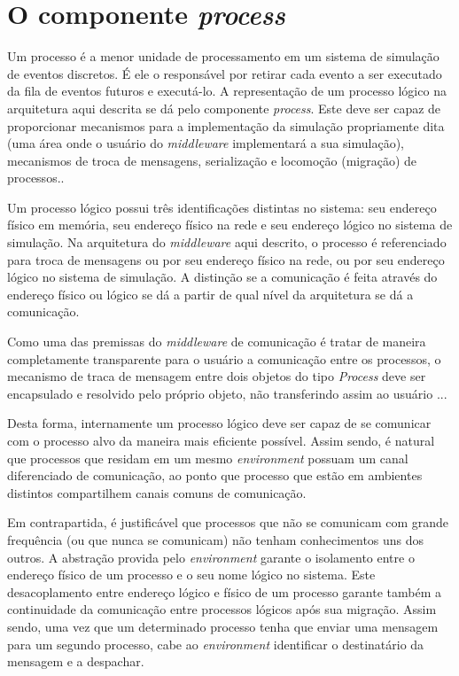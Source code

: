 \section{O componente \textit{process} \label{process}}

Um processo é a menor unidade de processamento em um sistema de simulação de eventos discretos. É ele o responsável por retirar cada evento a ser executado da fila de eventos futuros e executá-lo. A representação de um processo lógico na arquitetura aqui descrita se dá pelo componente \textit{process}. Este deve ser capaz de proporcionar mecanismos para a implementação da simulação propriamente dita (uma área onde o usuário do \textit{middleware} implementará a sua simulação), mecanismos de troca de mensagens, serialização e locomoção (migração) de processos..

Um processo lógico possui três identificações distintas no sistema: seu endereço físico em memória, seu endereço físico na rede e seu endereço lógico no sistema de simulação. Na arquitetura do \textit{middleware} aqui descrito, o processo é referenciado para troca de mensagens ou por seu endereço físico na rede, ou por seu endereço lógico no sistema de simulação. A distinção se a comunicação é feita através do endereço físico ou lógico se dá a partir de qual nível da arquitetura se dá a comunicação.

Como uma das premissas do \textit{middleware} de comunicação é tratar de maneira completamente transparente para o usuário a comunicação entre os processos, o mecanismo de traca de mensagem entre dois objetos do tipo \textit{Process} deve ser encapsulado e resolvido pelo próprio objeto, não transferindo assim ao usuário ...


Desta forma, internamente um processo lógico deve ser capaz de se comunicar com o processo alvo da maneira mais eficiente possível. Assim sendo, é natural que processos que residam em um mesmo \textit{environment} possuam um canal diferenciado de comunicação, ao ponto que processo que estão em ambientes distintos compartilhem canais comuns de comunicação.

Em contrapartida, é justificável que processos que não se comunicam com grande frequência (ou que nunca se comunicam) não tenham conhecimentos uns dos outros. A abstração provida pelo \textit{environment} garante o isolamento entre o endereço físico de um processo e o seu nome lógico no sistema. Este desacoplamento entre endereço lógico e físico de um processo garante também a continuidade da comunicação entre processos lógicos após sua migração. Assim sendo, uma vez que um determinado processo tenha que enviar uma mensagem para um segundo processo, cabe ao \textit{environment} identificar o destinatário da mensagem e a despachar.

